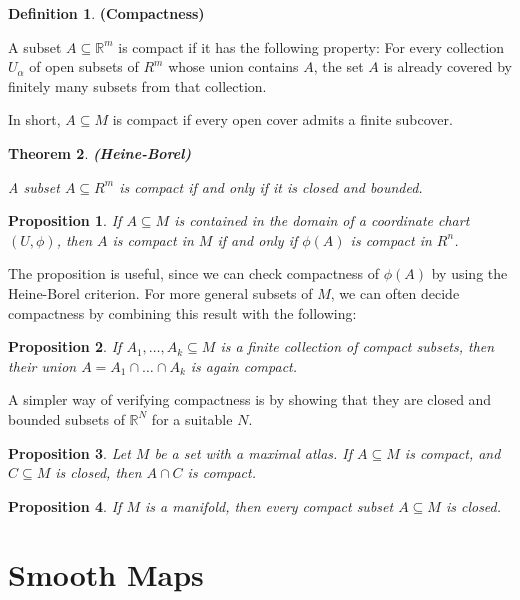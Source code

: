 \documentclass{article}
\newtheorem{theorem}{Theorem}[section]
\newtheorem{proposition}{Proposition}[theorem]
\theoremstyle{definition}
\newtheorem{defn}[theorem]{Definition}
\newenvironment{definition}
  {\vspace{8pt}\begin{mdframed}[backgroundcolor=blueish]\begin{defn}}
  {\end{defn}\end{mdframed}\vspace{4pt}}
\begin{document}
\begin{definition} \textbf{(Compactness)}

A subset $A \subseteq \mathbb R^m$ is compact if it has the following property: For every collection ${U_\alpha}$ of open subsets of $R^m$ whose union contains $A$, the set $A$ is already covered by finitely many subsets from that collection. 
\end{definition}
In short, $A \subseteq M$ is compact if every open cover admits a finite subcover.

\begin{theorem} \textbf{(Heine-Borel)}

A subset $A \subseteq R^m$ is compact if and only if it is closed
and bounded.
\end{theorem}

\begin{proposition}

If $A \subseteq M$ is contained in the domain of a coordinate chart $(U,\phi)$, then $A$ is compact in $M$ if and only if $\phi(A)$ is compact in $R^n$.
\end{proposition}

The proposition is useful, since we can check compactness of $\phi(A)$ by using the Heine-Borel criterion. For more general subsets of $M$, we can often decide compactness by combining this result with the following:

\begin{proposition}

If $A_1,\dots,A_k \subseteq M$ is a finite collection of compact subsets, then their union $A = A_1 \cap \dots \cap A_k$ is again compact.
\end{proposition}

A simpler way of verifying compactness is by showing that they are closed and bounded subsets of $\mathbb R^N$ for a suitable $N$.

\begin{proposition}

Let $M$ be a set with a maximal atlas. If $A \subseteq M$ is compact, and $C \subseteq M$ is closed, then $A \cap C$ is compact.
\end{proposition}

\begin{proposition}
If $M$ is a manifold, then every compact subset $A \subseteq M$ is closed.
\end{proposition}

\newpage
\section{Smooth Maps}
\end{document}
